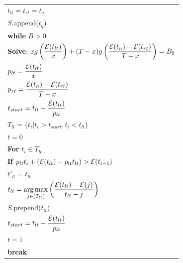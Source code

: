 \begin{table}
\begin{minipage}[b]{8cm}
\begin{tabular}{p{7cm}}
$t_{lt} = t_{rt} = t_q$
\\
$S$.append($t_q$)
\\
\textbf{while} $B>0$
\\
\hspace{4mm}\textbf{Solve}: $xg\left(\dfrac{\mathcal{E}(t_{lt})}{x}\right)+(T-x)g\left(\dfrac{\mathcal{E}(t_n)-\mathcal{E}(t_{rt})}{T-x}\right) = B_0$
\\
\hspace{4mm}$p_{lt} = \dfrac{\mathcal{E}(t_{lt})}{x}$
\\
\hspace{4mm}$p_{rt} = \dfrac{\mathcal{E}(t_n)-\mathcal{E}(t_{rt})}{T-x}$
\\
\hspace{4mm}$t_{start} = t_{lt} - \dfrac{\mathcal{E}(t_{lt})}{p_{lt}}$
\\
\hspace{4mm}$T_{lt} = \{t_i | t_i >t_{start}, t_i < t_{lt}   \}$
\\
\hspace{4mm}$t=0$
\\
\hspace{4mm}\textbf{For} $t_i \in T_{lt}$
\\
\hspace{7mm}\textbf{If} $p_{lt}t_i + (\mathcal{E}(t_{lt}) - p_{lt}t_{lt}) > \mathcal{E}(t_{i-1})$
\\
\hspace{10mm}$t'_{lt} = t_{lt}$
\\
\hspace{10mm}$t_{lt} = \displaystyle \operatorname*{arg\,max}_{j\in(T_{lt})}\left(\dfrac{\mathcal{E}(t_{lt}) - \mathcal{E}(j)}{t_{lt}-j}\right)$
\\
\hspace{10mm}$S$.prepend($t_{lt}$)
\\
\hspace{10mm}$t_{start} = t_{lt} - \dfrac{\mathcal{E}(t_{lt})}{p_{lt}}$
\\
\hspace{10mm}$t=1$
\\
\hspace{10mm}\textbf{break}
\\

\end{tabular}
\end{minipage}
\end{table}
